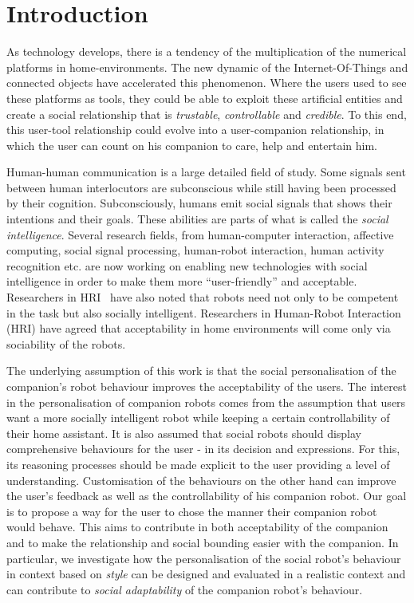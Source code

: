 \section{Introduction}
\label{sec:introduction}
As technology develops, there is a tendency of the multiplication of the numerical platforms in home-environments. 
The new dynamic of the Internet-Of-Things and connected objects have accelerated this phenomenon. 
Where the users used to see these platforms as tools, they could be able to exploit these artificial entities and create a social relationship that is \emph{trustable}, \emph{controllable} and \emph{credible}. 
To this end, this user-tool relationship could evolve into a user-companion relationship, in which the user can count on his companion to care, help and entertain him.

Human-human communication is a large detailed field of study. 
Some signals sent between human interlocutors are subconscious while still having been processed by their cognition.
Subconsciously, humans emit social signals that shows their intentions and their goals.
These abilities are parts of what is called the \emph{social intelligence}.
Several research fields, from human-computer interaction, affective computing, social signal processing, human-robot interaction, human activity recognition etc. are now working on enabling new technologies with social intelligence in order to make them more ``user-friendly'' and acceptable.
Researchers in HRI~\cite{Tapus2007,Dautenhahn2007} have also noted that robots need not only to be competent in the task but also socially intelligent.
Researchers in Human-Robot Interaction (HRI) have agreed that acceptability in home environments will come only via sociability \cite{Dautenhahn2007} of the robots.


The underlying assumption of this work is that the social personalisation of the companion's robot behaviour improves the acceptability of the users.
The interest in the personalisation of companion robots comes from the assumption that users want a more socially intelligent robot while keeping a certain controllability of their home assistant.
It is also assumed that social robots should display comprehensive behaviours for the user - in its decision and expressions.
For this, its reasoning processes should be made explicit to the user providing a level of understanding. 
Customisation of the behaviours on the other hand can improve the user's feedback as well as the controllability of his companion robot.
Our goal is to propose a way for the user to chose the manner their companion robot would behave. 
This aims to contribute in both acceptability of the companion and to make the relationship and social bounding easier with the companion. 
In particular, we investigate how the personalisation of the social robot's behaviour in context based on \emph{style} can be designed and evaluated in a realistic context and can contribute to \emph{social adaptability} of the companion robot's behaviour.

